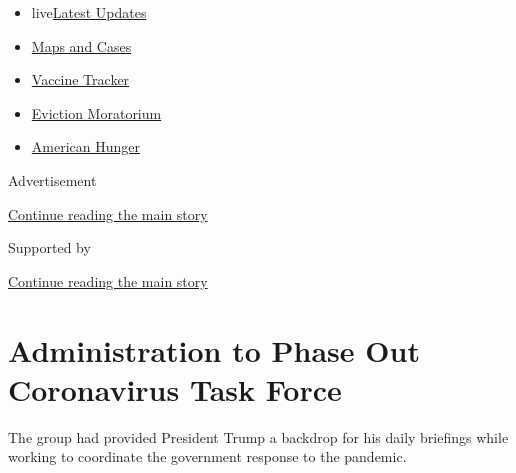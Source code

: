 \begin{itemize}
\tightlist
\item
  live\href{https://www.nytimes3xbfgragh.onion/2020/09/09/world/covid-19-coronavirus.html?name=styln-coronavirus-national\&region=TOP_BANNER\&block=storyline_menu_recirc\&action=click\&pgtype=Article\&impression_id=7d5f0e31-f292-11ea-84d9-09ec1c57291a\&variant=undefined}{Latest
  Updates}
\item
  \href{https://www.nytimes3xbfgragh.onion/interactive/2020/us/coronavirus-us-cases.html?name=styln-coronavirus-national\&region=TOP_BANNER\&block=storyline_menu_recirc\&action=click\&pgtype=Article\&impression_id=7d5f3540-f292-11ea-84d9-09ec1c57291a\&variant=undefined}{Maps
  and Cases}
\item
  \href{https://www.nytimes3xbfgragh.onion/interactive/2020/science/coronavirus-vaccine-tracker.html?name=styln-coronavirus-national\&region=TOP_BANNER\&block=storyline_menu_recirc\&action=click\&pgtype=Article\&impression_id=7d5f3541-f292-11ea-84d9-09ec1c57291a\&variant=undefined}{Vaccine
  Tracker}
\item
  \href{https://www.nytimes3xbfgragh.onion/2020/09/02/your-money/eviction-moratorium-covid.html?name=styln-coronavirus-national\&region=TOP_BANNER\&block=storyline_menu_recirc\&action=click\&pgtype=Article\&impression_id=7d5f3542-f292-11ea-84d9-09ec1c57291a\&variant=undefined}{Eviction
  Moratorium}
\item
  \href{https://www.nytimes3xbfgragh.onion/interactive/2020/09/02/magazine/food-insecurity-hunger-us.html?name=styln-coronavirus-national\&region=TOP_BANNER\&block=storyline_menu_recirc\&action=click\&pgtype=Article\&impression_id=7d5f3543-f292-11ea-84d9-09ec1c57291a\&variant=undefined}{American
  Hunger}
\end{itemize}

Advertisement

\protect\hyperlink{after-top}{Continue reading the main story}

Supported by

\protect\hyperlink{after-sponsor}{Continue reading the main story}

\hypertarget{administration-to-phase-out-coronavirus-task-force}{%
\section{Administration to Phase Out Coronavirus Task
Force}\label{administration-to-phase-out-coronavirus-task-force}}

The group had provided President Trump a backdrop for his daily
briefings while working to coordinate the government response to the
pandemic.

